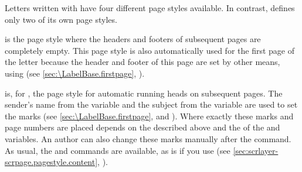 \begin{Declaration}
\end{Declaration}%
%
%
%
%
Letters written with  have four
different page styles available. In contrast,
 defines only two of its own
page styles.
\begin{description}
\item[{\PageStyle{empty}}]
   is the page style where the headers and footers of
  subsequent pages are completely empty. This page style is also automatically
  used for the first page of the letter because the header and footer of this
  page are set by other means, using
   (see
  \autoref{sec:\LabelBase.firstpage}, ).
\item[{\PageStyle{headings}}]
   is, for ,
  the page style for automatic running heads on subsequent pages. The sender's
  name from the 
  variable and the subject from the
   variable are
  used to set the marks (see \autoref{sec:\LabelBase.firstpage},
   and
  ). Where exactly these marks and
  page numbers are placed depends on the
   described above and the
   of the
   and
   variables. An
  author can also change these marks manually after the
   command. As usual, the
   and 
  commands are available, as is  if you
  use \hyperref[cha:scrlayer-scrpage]{}%
  (see \autoref{sec:scrlayer-scrpage.pagestyle.content},
  ).


\end{description}
